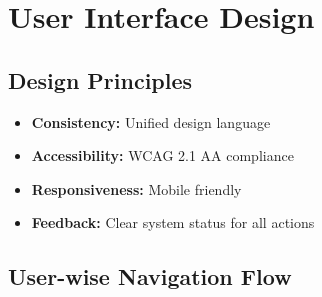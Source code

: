 \documentclass[a4paper, 11pt]{scrreprt}
\begin{document}

\chapter{User Interface Design}

\section{Design Principles}
\begin{itemize}
    \item \textbf{Consistency:} Unified design language
    \item \textbf{Accessibility:} WCAG 2.1 AA compliance
    \item \textbf{Responsiveness:} Mobile friendly
    \item \textbf{Feedback:} Clear system status for all actions
\end{itemize}

\section{User-wise Navigation Flow}
\end{document}
